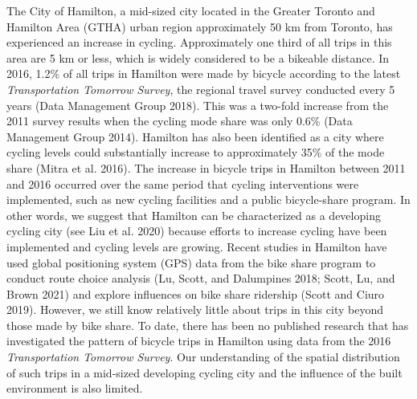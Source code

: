 \documentclass[smallextended]{svjour3}       %
\begin{document}
The City of Hamilton, a mid-sized city located in the Greater Toronto
and Hamilton Area (GTHA) urban region approximately 50 km from Toronto,
has experienced an increase in cycling. Approximately one third of all
trips in this area are 5 km or less, which is widely considered to be a
bikeable distance. In 2016, 1.2\% of all trips in Hamilton were made by
bicycle according to the latest \emph{Transportation Tomorrow Survey},
the regional travel survey conducted every 5 years (Data Management
Group 2018). This was a two-fold increase from the 2011 survey results
when the cycling mode share was only 0.6\% (Data Management Group 2014).
Hamilton has also been identified as a city where cycling levels could
substantially increase to approximately 35\% of the mode share (Mitra et
al. 2016). The increase in bicycle trips in Hamilton between 2011 and
2016 occurred over the same period that cycling interventions were
implemented, such as new cycling facilities and a public bicycle-share
program. In other words, we suggest that Hamilton can be characterized
as a developing cycling city (see Liu et al. 2020) because efforts to
increase cycling have been implemented and cycling levels are growing.
Recent studies in Hamilton have used global positioning system (GPS)
data from the bike share program to conduct route choice analysis (Lu,
Scott, and Dalumpines 2018; Scott, Lu, and Brown 2021) and explore
influences on bike share ridership (Scott and Ciuro 2019). However, we
still know relatively little about trips in this city beyond those made
by bike share. To date, there has been no published research that has
investigated the pattern of bicycle trips in Hamilton using data from
the 2016 \emph{Transportation Tomorrow Survey}. Our understanding of the
spatial distribution of such trips in a mid-sized developing cycling
city and the influence of the built environment is also limited.
\end{document}
